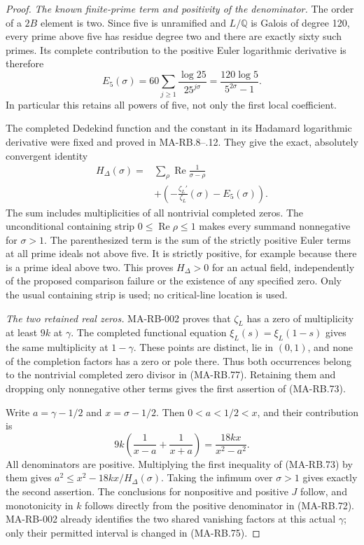 \begin{proof}
\emph{The known finite-prime term and positivity of the denominator.}
The order of a \(2B\) element is two.  Since five is
unramified and \(L/\mathbb Q\) is Galois of degree 120,
every prime above five has residue degree two and there
are exactly sixty such primes.  Its complete contribution
to the positive Euler logarithmic derivative is therefore
\[
 E_5(\sigma)
    =60\sum_{j\ge1}\frac{\log25}{25^{j\sigma}}
    =\frac{120\log5}{5^{2\sigma}-1}.
 \tag{MA-RB.76}
\]
In particular this retains all powers of five, not only
the first local coefficient.

The completed Dedekind function and the constant in its
Hadamard logarithmic derivative were fixed and proved in
MA-RB.8--.12.  They give the exact, absolutely convergent
identity
\[
 \begin{split}
 H_\Delta(\sigma)
  ={}&\sum_\rho\operatorname{Re}\frac1{\sigma-\rho}\\
     &+\left(-\frac{\zeta_L'}{\zeta_L}(\sigma)
                                      -E_5(\sigma)\right).
 \end{split}
 \tag{MA-RB.77}
\]
The sum includes multiplicities of all nontrivial completed
zeros.  The unconditional containing strip
\(0\le\operatorname{Re}\rho\le1\) makes every summand
nonnegative for \(\sigma>1\).  The parenthesized term
is the sum of the strictly positive Euler terms at all
prime ideals not above five.  It is strictly positive,
for example because there is a prime ideal above two.
This proves \(H_\Delta>0\) for an actual field, independently
of the proposed comparison failure or the existence of
any specified zero.  Only the usual containing strip is
used; no critical-line location is used.

\emph{The two retained real zeros.}
MA-RB-002 proves that \(\zeta_L\) has a zero of
multiplicity at least \(9k\) at \(\gamma\).
The completed functional equation
\(\xi_L(s)=\xi_L(1-s)\) gives the same multiplicity
at \(1-\gamma\).  These points are distinct, lie in
\((0,1)\), and none of the completion factors has a
zero or pole there.  Thus both occurrences belong to
the nontrivial completed zero divisor in (MA-RB.77).
Retaining them and dropping only nonnegative other
terms gives the first assertion of (MA-RB.73).

Write \(a=\gamma-1/2\) and \(x=\sigma-1/2\).
Then \(0<a<1/2<x\), and their contribution is
\[
 9k\left(\frac1{x-a}+\frac1{x+a}\right)
          =\frac{18kx}{x^2-a^2}.
 \tag{MA-RB.78}
\]
All denominators are positive.  Multiplying the first
inequality of (MA-RB.73) by them gives
\(a^2\le x^2-18kx/H_\Delta(\sigma)\).
Taking the infimum over \(\sigma>1\) gives exactly
the second assertion.  The conclusions for nonpositive
and positive \(J\) follow, and monotonicity in \(k\)
follows directly from the positive denominator in
(MA-RB.72).  MA-RB-002 already identifies the two
shared vanishing factors at this actual \(\gamma\);
only their permitted interval is changed in (MA-RB.75).


\end{proof}
